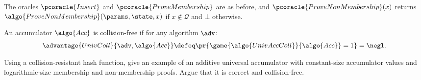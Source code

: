 \begin{mysolution}
  The oracles $\pcoracle{Insert}$ and $\pcoracle{ProveMembership}$ are as before, and $\pcoracle{ProveNonMembership}(x)$ returns $\algo{ProveNonMembership}(\params, \state, x)$ if $x \notin \mathcal{Q}$ and $\bot$ otherwise.
  
  An accumulator $\algo{Acc}$ is collision-free if for any \ppt algorithm $\adv$:
  \[
    \advantage{UnivColl}{\adv, \algo{Acc}} \defeq \pr{\game{\algo{UnivAccColl}}{\algo{Acc}} = 1} = \negl.
  \]
\end{mysolution}
\fi

\begin{exercise}[Optional]
  Using a collision-resistant hash function, give an example of an additive universal accumulator with constant-size accumulator values and logarithmic-size membership and non-membership proofs.
  Argue that it is correct and collision-free.
\end{exercise}

